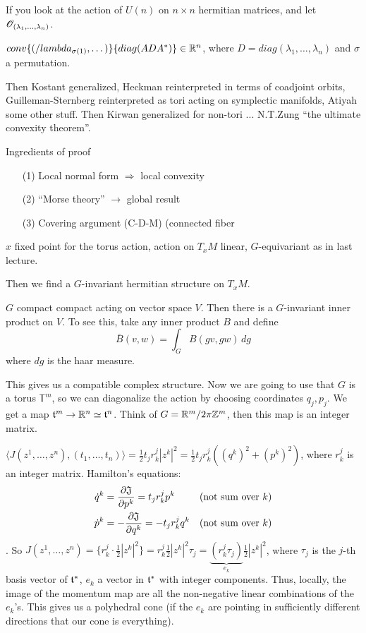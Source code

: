  \setcounter{lecture}{18}

 \begin{theorem}
   If you look at the action of $U(n)$ on $n\times n$ hermitian matrices, and let
   $\mathscr{O}_{(\lambda_1,\dots, \lambda_n)}$.

  $conv\{(/lambda_{\sigma(1)},\dots)\}\{diag(ADA^*)\}\in \mathbb{R}^n$, where
  $D=diag(\lambda_1,\dots, \lambda_n)$ and $\sigma$ a permutation.
 \end{theorem}

 Then Kostant generalized, Heckman reinterpreted in terms of coadjoint orbits,
 Guilleman-Sternberg reinterpreted as tori acting on symplectic manifolds, Atiyah some
 other stuff.  Then Kirwan generalized for non-tori ... N.T.Zung ``the ultimate
 convexity theorem''.

 Ingredients of proof
 \begin{itemize}
 \item[(1)] Local normal form $\Rightarrow$ local convexity
 \item[(2)] ``Morse theory'' $\rightarrow$ global result
 \item[(3)] Covering argument (C-D-M) (connected fiber
 \end{itemize}

 $x$ fixed point for the torus action, action on $T_xM$ linear, $G$-equivariant as in
 last lecture.

 Then we find a $G$-invariant hermitian structure on $T_xM$.

 $G$ compact compact acting on vector space $V$.  Then there is a $G$-invariant inner
 product on $V$.  To see this, take any inner product $B$ and define
 \[
    \bar B(v,w) = \int_G B(gv,gw)\, dg
 \]
 where $dg$ is the haar measure.

 This gives us a compatible complex structure.  Now we are going to use that $G$ is a
 torus $\mathbb{T}^m$, so we can diagonalize the action by choosing coordinates
 $q_j,p_j$.  We get a map $\mathfrak{t}^m\to \mathbb{R}^n\simeq \mathfrak{t}^n$.  Think of $G=\mathbb{R}^m/2\pi \mathbb{Z}^m$,
 then this map is an integer matrix.

 $\langle J(z^1,\dots, z^n),(t_1,\dots, t_n)\rangle = \frac{1}{2}t_jr^j_k|z^k|^2 =
 \frac{1}{2}t_jr^j_k((q^k)^2+(p^k)^2)$, where $r^j_k$ is an integer matrix.
 Hamilton's equations:
 \begin{align*}
   \dot{q}^k &= \frac{\partial \mathfrak{J}}{\partial p^k} = t_jr^j_kp^k & (\text{not sum over $k$})\\
   \dot{p}^k &= -\frac{\partial \mathfrak{J}}{\partial q^k} = -t_jr^j_kq^k &(\text{not sum over $k$})
 \end{align*}
 .  So $J(z^1,\dots, z^n)=\{r^j_k\cdot
 \frac{1}{2}|z^k|^2\}=r^j_k\frac{1}{2}|z^k|^2\tau_j =
 \underbrace{(r^j_k\tau_j)}_{e_k}\frac{1}{2}|z^k|^2$, where $\tau_j$ is the $j$-th
 basis vector of $\mathfrak{t}^*$, $e_k$ a vector in $\mathfrak{t}^*$ with integer components.  Thus,
 locally, the image of the momentum map are all the non-negative linear combinations
 of the $e_k$'s.  This gives us a polyhedral cone (if the $e_k$ are pointing in
 sufficiently different directions that our cone is everything).


